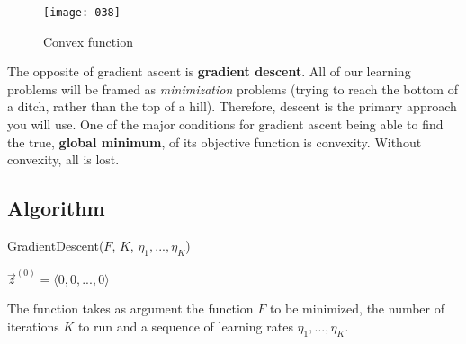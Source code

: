 \begin{wrapfigure}{l}{0.25\textwidth}
\begin{center}
    \texttt{[image: 038]}
    \caption{Convex function}
	\vspace*{-40pt}
\end{center}
\label{fig:038}
\end{wrapfigure}

The opposite of gradient ascent is \textbf{gradient descent}. All of our learning problems will be framed as \emph{minimization} problems (trying to reach the bottom of a ditch, rather than the top of a hill). Therefore, descent is the primary approach you will use. One of the major conditions for gradient ascent being able to find the true, \textbf{global minimum}, of its objective function is convexity. Without convexity, all is lost.

\subsection{Algorithm}
\begin{algorithm}
    \caption{GradientDescent($F$, $K$, $\eta_1, ..., \eta_K$)}
    \label{alg:gradient_descent}
$\vec{z}^{(0)} = \langle 0,0,...,0 \rangle $\;
\end{algorithm}
The function takes as argument the function \(F\) to be minimized, the number of iterations \(K\) to run and a sequence of learning rates \(\eta_1, ..., \eta_K\). 

